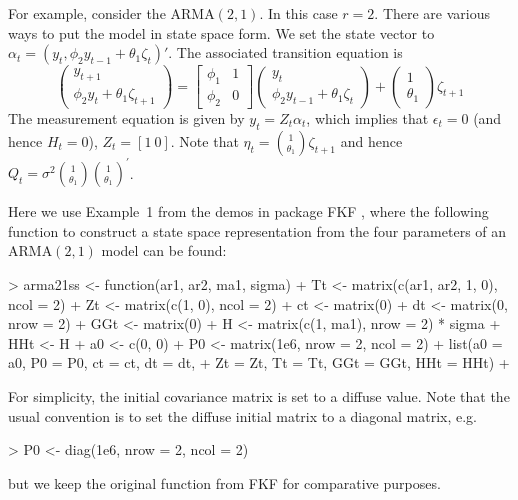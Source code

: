 \documentclass{article}
\begin{document}
For example, consider the $\text{ARMA}(2, 1)$.
In this case $r=2$. There are various ways to put the model in state space form.
We set the state vector to $\alpha_{t} = (y_{t} , \phi_2 y_{t-1} + \theta_1 \zeta_{t})'$.
The associated transition equation is
\begin{equation*}
  \begin{pmatrix}
    y_{t+1}\\
    \phi_2 y_t + \theta_1 \zeta_{t+1}
  \end{pmatrix}
  =
  \begin{bmatrix}
    \phi_1 & 1 \\
    \phi_2 & 0
  \end{bmatrix}
  \begin{pmatrix}
    y_{t}\\
    \phi_2 y_{t-1} + \theta_1 \zeta_{t}
  \end{pmatrix}
  +
  \begin{pmatrix}
    1\\
    \theta_1
  \end{pmatrix}
  \zeta_{t+1}
  \label{eq:Arma21}
\end{equation*}
The measurement equation is given by $y_t = Z_t \alpha_t$, which implies that $\epsilon_t=0 $
(and hence $H_t=0$), $Z_t=[1 \ 0]$.  Note that $ \eta_t = \binom{1}{\theta_1}\zeta_{t+1} $
and hence $ Q_t= \sigma^2 \binom{1}{\theta_1} \binom{1}{\theta_1}^\prime$.

Here we use Example~1 from the demos in package FKF \citep{FKFpackage}, where the following
function to construct a state space representation from the four parameters of an
$\text{ARMA}(2, 1)$ model can be found:
\begin{Schunk}
\begin{Sinput}
> arma21ss <- function(ar1, ar2, ma1, sigma) {
+     Tt <- matrix(c(ar1, ar2, 1, 0), ncol = 2)
+     Zt <- matrix(c(1, 0), ncol = 2)
+     ct <- matrix(0)
+     dt <- matrix(0, nrow = 2)
+     GGt <- matrix(0)
+     H <- matrix(c(1, ma1), nrow = 2) * sigma
+     HHt <- H %
+     a0 <- c(0, 0)
+     P0 <- matrix(1e6, nrow = 2, ncol = 2)
+     list(a0 = a0, P0 = P0, ct = ct, dt = dt,
+          Zt = Zt, Tt = Tt, GGt = GGt, HHt = HHt)
+ }
\end{Sinput}
\end{Schunk}
For simplicity, the initial covariance matrix is set to a diffuse value. Note that the
usual convention is to set the diffuse initial matrix to a diagonal matrix, e.g.
\begin{Schunk}
\begin{Sinput}
> P0 <- diag(1e6, nrow = 2, ncol = 2)
\end{Sinput}
\end{Schunk}
but we keep the original function from FKF for comparative purposes.
\end{document}
